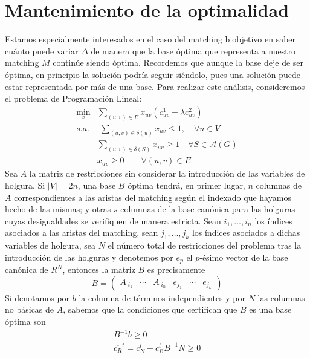 \documentclass[twoside,a4paper,openright,12pt]{book}
\begin{document}
\section{Mantenimiento de la optimalidad}
Estamos especialmente interesados en el caso del matching biobjetivo en saber cuánto puede variar $\Delta$ de manera que la base óptima que representa a nuestro matching $M$ continúe siendo óptima. Recordemos que aunque la base deje de ser óptima, en principio la solución podría seguir siéndolo, pues una solución puede estar representada por más de una base. Para realizar este análisis, consideremos el problema de Programación Lineal:
\begin{align*}
\min_x & \sum_{(u,v) \in E}x_{uv}(c^1_{uv} + \lambda c^2_{uv})\\
s.a.&\;\sum_{(u,v)\in\delta(u)} x_{uv} \leq 1, \quad \forall u \in V\\
&\sum_{(u,v)\in \delta(S)} x_{uv} \geq 1\quad \forall S \in \mathcal{A}(G)	\\
&x_{uv} \geq 0 \qquad \forall(u,v)\in E
\end{align*}
Sea $A$ la matriz de restricciones sin considerar la introducción de las variables de holgura. Si $|V|=2n$, una base $B$ óptima tendrá, en primer lugar, $n$ columnas de $A$ correspondientes a las aristas del matching según el indexado que hayamos hecho de las mismas; y otras $s$ columnas de la base canónica para las holguras cuyas desigualdades se verifiquen de manera estricta. Sean $i_1,\dotsc,i_n$ los índices asociados a las aristas del matching, sean $j_1,\dotsc,j_k$ los índices asociados a dichas variables de holgura, sea $N$ el número total de restricciones del problema tras la introducción de las holguras y denotemos por $e_p$ el $p$-ésimo vector de la base canónica de $R^N$, entonces la matriz $B$ es precisamente
$$ B= 
\begin{pmatrix}
A_{\cdot i_1} & \cdots & A_{\cdot i_n} & e_{j_1} & \cdots & e_{j_k}
\end{pmatrix}
$$
Si denotamos por $b$ la columna de términos independientes y por $N$ las columnas no básicas de $A$, sabemos que la condiciones que certifican que $B$ es una base óptima son
\begin{align*}
B^{-1}b\geq0\\
\overline{c_R}^t = c_N^t - c_B^t B^{-1}N\geq 0
\end{align*}
\end{document}
